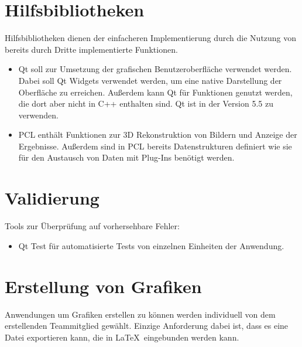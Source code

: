 \section{Hilfsbibliotheken}
	Hilfsbibliotheken dienen der einfacheren Implementierung durch die Nutzung von bereits durch Dritte implementierte Funktionen.
	\begin{itemize}
		\item Qt soll zur Umsetzung der grafischen Benutzeroberfläche verwendet werden. Dabei soll Qt Widgets verwendet werden, um eine native Darstellung der Oberfläche zu erreichen. Außerdem kann Qt für Funktionen genutzt werden, die dort aber nicht in C++ enthalten sind. Qt ist in der Version 5.5 zu verwenden.
		\item PCL enthält Funktionen zur 3D Rekonstruktion von Bildern und Anzeige der Ergebnisse. Außerdem sind in PCL bereits Datenstrukturen definiert wie sie für den Austausch von Daten mit Plug-Ins benötigt werden.
	\end{itemize}
\section{Validierung}
	Tools zur Überprüfung auf vorhersehbare Fehler:
	\begin{itemize}
		\item Qt Test für automatisierte Tests von einzelnen Einheiten der Anwendung.
	\end{itemize}
\section{Erstellung von Grafiken}
	Anwendungen um Grafiken erstellen zu können werden individuell von dem erstellenden Teammitglied gewählt. Einzige Anforderung dabei ist, dass es eine Datei exportieren kann, die in \LaTeX\ eingebunden werden kann.
